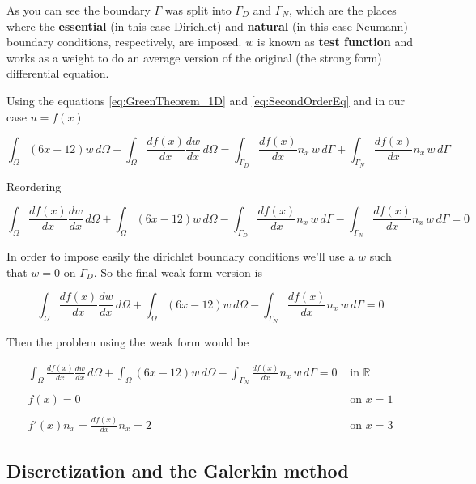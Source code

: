 \documentclass[letterpaper,10pt]{article}
\begin{document}
As you can see the boundary $\Gamma$ was split into $\Gamma_D$ and $\Gamma_N$, which are the places where the \textbf{essential} (in this case Dirichlet) %
and \textbf{natural} (in this case Neumann) %
 boundary conditions, respectively, are imposed. $w$ is known as \textbf{test function} and works as a weight to do an average version of the original (the strong form) differential equation.

Using the equations \ref{eq:GreenTheorem_1D} and \ref{eq:SecondOrderEq} and in our case $u = f(x)$

\[
\int_{\Omega} (6x-12) w \, d\Omega + \int_{\Omega} \frac{d f(x)}{d x} \frac{d w}{d x} \, d\Omega = \int_{\Gamma_D} \frac{d f(x)}{d x} n_x \, w \, d\Gamma + \int_{\Gamma_N} \frac{d f(x)}{d x} n_x \, w \, d\Gamma
\]

Reordering

\[
\int_{\Omega} \frac{d f(x)}{d x} \frac{d w}{d x} \, d\Omega + \int_{\Omega} (6x-12) w \, d\Omega - \int_{\Gamma_D} \frac{d f(x)}{d x} n_x \, w \, d\Gamma - \int_{\Gamma_N} \frac{d f(x)}{d x} n_x \, w \, d\Gamma = 0
\]

In order to impose easily the dirichlet boundary conditions we'll use a $w$ such that $w=0$ on $\Gamma_D$. So the final weak form version is

\begin{equation}
\int_{\Omega} \frac{d f(x)}{d x} \frac{d w}{d x} \, d\Omega + \int_{\Omega} (6x-12) w \, d\Omega - \int_{\Gamma_N} \frac{d f(x)}{d x} n_x \, w \, d\Gamma = 0
\end{equation}

Then the problem using the weak form would be

\begin{equation}
\begin{array}{rl}
\displaystyle
\int_{\Omega} \frac{d f(x)}{d x} \frac{d w}{d x} \, d\Omega + \int_{\Omega} (6x-12) w \, d\Omega - \int_{\Gamma_N} \frac{d f(x)}{d x} n_x \, w \, d\Gamma = 0 & \textrm{ in } \mathbb{R} \\ \\
\displaystyle
f(x) = 0 & \textrm{ on } x = 1 \\ \\
\displaystyle
f'(x) n_x = \frac{d f(x)}{d x} n_x = 2 & \textrm{ on } x = 3 
\end{array}
\label{eq:Problem_WeakForm}
\end{equation}

\subsection{Discretization and the Galerkin method}
\end{document}
